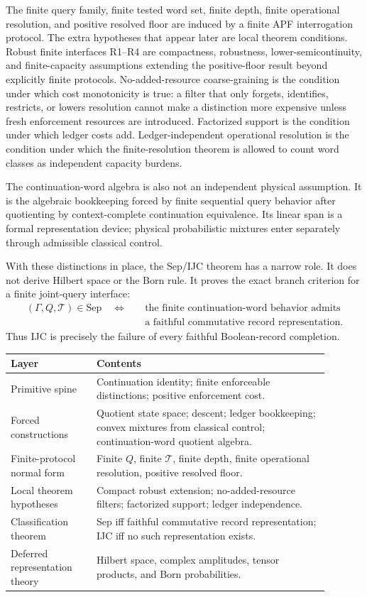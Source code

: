 \documentclass[11pt]{article}
\newcommand{\Sep}{\mathrm{Sep}}
\begin{document}
The finite query family, finite tested word set, finite depth, finite operational resolution, and positive resolved floor are induced by a finite APF interrogation protocol.  The extra hypotheses that appear later are local theorem conditions.  Robust finite interfaces R1--R4 are compactness, robustness, lower-semicontinuity, and finite-capacity assumptions extending the positive-floor result beyond explicitly finite protocols.  No-added-resource coarse-graining is the condition under which cost monotonicity is true: a filter that only forgets, identifies, restricts, or lowers resolution cannot make a distinction more expensive unless fresh enforcement resources are introduced.  Factorized support is the condition under which ledger costs add.  Ledger-independent operational resolution is the condition under which the finite-resolution theorem is allowed to count word classes as independent capacity burdens.

The continuation-word algebra is also not an independent physical assumption.  It is the algebraic bookkeeping forced by finite sequential query behavior after quotienting by context-complete continuation equivalence.  Its linear span is a formal representation device; physical probabilistic mixtures enter separately through admissible classical control.

With these distinctions in place, the Sep/IJC theorem has a narrow role.  It does not derive Hilbert space or the Born rule.  It proves the exact branch criterion for a finite joint-query interface:
\[
\begin{aligned}
(\Gamma,Q,\mathcal T)\in\Sep
\quad\Longleftrightarrow\quad
&\text{the finite continuation-word behavior admits}\\
&\text{a faithful commutative record representation.}
\end{aligned}
\]
Thus IJC is precisely the failure of every faithful Boolean-record completion.

\begin{center}
\scriptsize
\begin{tabular}{@{}p{0.24\linewidth}p{0.65\linewidth}@{}}
\toprule
Layer & Contents \\
\midrule
Primitive spine & Continuation identity; finite enforceable distinctions; positive enforcement cost. \\
Forced constructions & Quotient state space; descent; ledger bookkeeping; convex mixtures from classical control; continuation-word quotient algebra. \\
Finite-protocol normal form & Finite $Q$, finite $\mathcal T$, finite depth, finite operational resolution, positive resolved floor. \\
Local theorem hypotheses & Compact robust extension; no-added-resource filters; factorized support; ledger independence. \\
Classification theorem & Sep iff faithful commutative record representation; IJC iff no such representation exists. \\
Deferred representation theory & Hilbert space, complex amplitudes, tensor products, and Born probabilities. \\
\bottomrule
\end{tabular}
\end{center}
\end{document}
